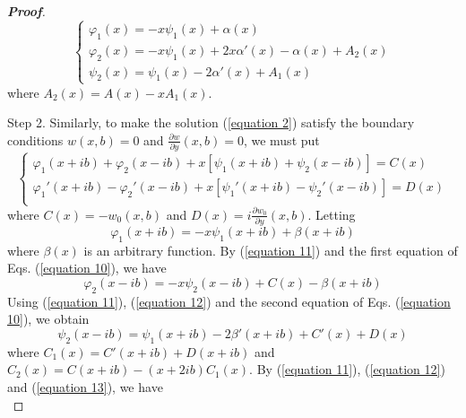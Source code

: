 \documentclass[a4paper]{article}      %
\begin{document}
\begin{proof}[{\bf Proof}]
\begin{equation}
        \left\{ {\begin{array}{*{20}{l}}
         {\varphi_{1}(x)=-x\psi_{1}(x)+\alpha(x)}\\
         {\varphi_{2}(x)=-x\psi_{1}(x)+2x\alpha'(x)-\alpha(x)+A_{2}(x)}\\
         {\psi_{2}(x)=\psi_{1}(x)-2\alpha'(x)+A_{1}(x)}
        \end{array}} \right.
        \end{equation}
    where $A_{2}(x)=A(x)-xA_{1}(x)$.%
    \item[\quad Step 2.] Similarly, to make the solution (\ref{equation 2}) satisfy the boundary conditions $w(x,b)=0$ and $\frac{{\partial w}}{{\partial y}}(x,b)=0$, we must put
        \begin{equation}\label{equation 10}                                 %
        \left\{ {\begin{array}{*{20}{l}}
         {\varphi_{1}(x+ib)+\varphi_{2}(x-ib)+x[\psi_{1}(x+ib)+\psi_{2}(x-ib)]=C(x)}\\
         {\varphi_{1}'(x+ib)-\varphi_{2}'(x-ib)+x[\psi_{1}'(x+ib)-\psi_{2}'(x-ib)]=D(x)}\\
        \end{array}} \right.
       \end{equation}
    where $C(x)=-w_{0}(x,b)$ and $D(x)=i\frac{{\partial w_{0}}}{{\partial y}}(x,b)$. Letting
        \begin{equation}\label{equation 11}                                 %
         \varphi_{1}(x+ib)=-x\psi_{1}(x+ib)+\beta(x+ib)
        \end{equation}
    where $\beta(x)$ is an arbitrary function. By (\ref{equation 11}) and the first equation of Eqs. (\ref{equation 10}), we have
    \begin{equation}\label{equation 12}                                     %
      \varphi_{2}(x-ib)=-x\psi_{2}(x-ib)+C(x)-\beta(x+ib)
    \end{equation}
    Using (\ref{equation 11}), (\ref{equation 12}) and the second equation of Eqs. (\ref{equation 10}), we obtain
        \begin{equation}\label{equation 13}                                     %
        \psi_{2}(x-ib)=\psi_{1}(x+ib)-2\beta'(x+ib)+C'(x)+D(x)
        \end{equation}
    where $C_{1}(x)=C'(x+ib)+D(x+ib)$ and $C_{2}(x)=C(x+ib)-(x+2ib)C_{1}(x)$.
    By (\ref{equation 11}), (\ref{equation 12}) and (\ref{equation 13}), we have
        \begin{equation}\label{equation 14}                                 %

\end{equation}
\end{proof}
\end{document}
